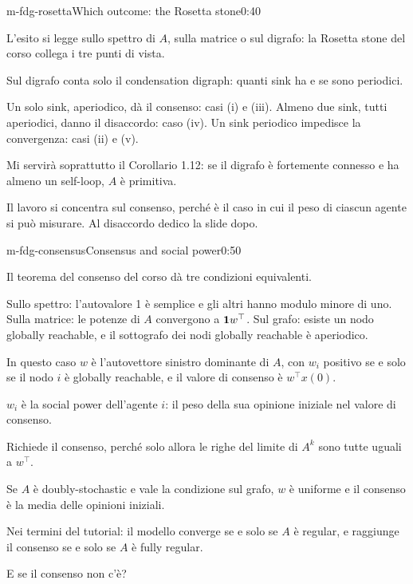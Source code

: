 \begin{slide}{m-fdg-rosetta}{Which outcome: the Rosetta stone}{0:40}
  \begin{discorso}
    \item L'esito si legge sullo spettro di $A$, sulla matrice o sul digrafo: la Rosetta stone del corso collega i tre punti di vista.
    \item Sul digrafo conta solo il condensation digraph: quanti sink ha e se sono periodici.
    \item Un solo sink, aperiodico, dà il consenso: casi (i) e (iii). Almeno due sink, tutti aperiodici, danno il disaccordo: caso (iv). Un sink periodico impedisce la convergenza: casi (ii) e (v).
    \item Mi servirà soprattutto il Corollario 1.12: se il digrafo è fortemente connesso e ha almeno un self-loop, $A$ è primitiva.
    \item Il lavoro si concentra sul consenso, perché è il caso in cui il peso di ciascun agente si può misurare. Al disaccordo dedico la slide dopo.
  \end{discorso}
\end{slide}

\begin{slide}{m-fdg-consensus}{Consensus and social power}{0:50}
  \begin{discorso}
    \item Il teorema del consenso del corso dà tre condizioni equivalenti.
    \item Sullo spettro: l'autovalore 1 è semplice e gli altri hanno modulo minore di uno. Sulla matrice: le potenze di $A$ convergono a $\mathbf{1} w^\top$. Sul grafo: esiste un nodo globally reachable, e il sottografo dei nodi globally reachable è aperiodico.
    \item In questo caso $w$ è l'autovettore sinistro dominante di $A$, con $w_i$ positivo se e solo se il nodo $i$ è globally reachable, e il valore di consenso è $w^\top x(0)$.
    \item $w_i$ è la social power dell'agente $i$: il peso della sua opinione iniziale nel valore di consenso.
    \item Richiede il consenso, perché solo allora le righe del limite di $A^k$ sono tutte uguali a $w^\top$.
    \item Se $A$ è doubly-stochastic e vale la condizione sul grafo, $w$ è uniforme e il consenso è la media delle opinioni iniziali.
    \item Nei termini del tutorial: il modello converge se e solo se $A$ è regular, e raggiunge il consenso se e solo se $A$ è fully regular.
    \item E se il consenso non c'è?
  \end{discorso}
\end{slide}

